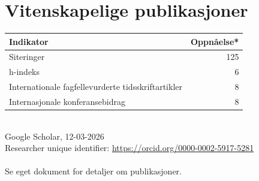 \documentclass[11pt,a4paper,sans]{moderncv}        %
\begin{document}
\vspace{4mm}

\section{Vitenskapelige publikasjoner}

\vspace{2mm}

\begin{tabular}{@{}l r@{}}
    \toprule
    \textbf{Indikator} & \textbf{Oppnåelse*} \\
    \midrule
    Siteringer & 125 \\
    h-indeks & 6 \\
    Internationale fagfellevurderte tidsskriftartikler & 8 \\
    Internasjonale konferansebidrag & 8 \\
    \bottomrule
\end{tabular} \vspace{2mm}\\
\text{*}Google Scholar, 12-03-2026 \\
Researcher unique identifier: \url{https://orcid.org/0000-0002-5917-5281}
\\ \\
Se eget dokument for detaljer om publikasjoner.

\end{document}
